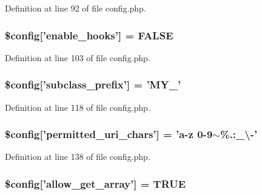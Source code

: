 Definition at line 92 of file config.\-php.

\hypertarget{application_2config_2config_8php_a2d80c3b160b2bb6f3329a9b07e970c51}{
\subsubsection[{\$config}]{\setlength{\rightskip}{0pt plus 5cm}\$config\mbox{[}'enable\-\_\-hooks'\mbox{]} = F\-A\-L\-S\-E}}\label{application_2config_2config_8php_a2d80c3b160b2bb6f3329a9b07e970c51}


Definition at line 103 of file config.\-php.

\hypertarget{application_2config_2config_8php_a51b79c9e455d64cb54212f2966b28ae6}{
\subsubsection[{\$config}]{\setlength{\rightskip}{0pt plus 5cm}\$config\mbox{[}'subclass\-\_\-prefix'\mbox{]} = 'M\-Y\-\_\-'}}\label{application_2config_2config_8php_a51b79c9e455d64cb54212f2966b28ae6}


Definition at line 118 of file config.\-php.

\hypertarget{application_2config_2config_8php_ae2e36375b245287a8851ac04565994de}{
\subsubsection[{\$config}]{\setlength{\rightskip}{0pt plus 5cm}\$config\mbox{[}'permitted\-\_\-uri\-\_\-chars'\mbox{]} = '{\bf a}-\/z 0-\/9$\sim$\%.\-:\-\_\-\textbackslash{}-\/'}}\label{application_2config_2config_8php_ae2e36375b245287a8851ac04565994de}


Definition at line 138 of file config.\-php.

\hypertarget{application_2config_2config_8php_ac714a2702b430e47833d82d6ee590298}{
\subsubsection[{\$config}]{\setlength{\rightskip}{0pt plus 5cm}\$config\mbox{[}'allow\-\_\-get\-\_\-array'\mbox{]} = T\-R\-U\-E}}\label{application_2config_2config_8php_ac714a2702b430e47833d82d6ee590298}


